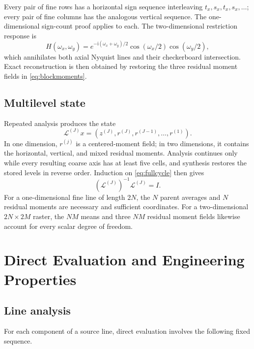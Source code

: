 \documentclass[journal]{IEEEtran}
\begin{document}
Every pair of fine rows has a horizontal sign sequence interleaving
\(t_x,s_x,t_x,s_x,\ldots\); every pair of fine columns has the analogous
vertical sequence. The one-dimensional sign-count proof applies to each.
The two-dimensional restriction response is
\begin{equation}
 H(\omega_x,\omega_y)=e^{-\mathrm i(\omega_x+\omega_y)/2}
 \cos(\omega_x/2)\cos(\omega_y/2),
 \label{eq:nyquist2d}
\end{equation}
which annihilates both axial Nyquist lines and their checkerboard
intersection. Exact reconstruction is then obtained by restoring the three
residual moment fields in \eqref{eq:blockmoments}.

\subsection{Multilevel state}

Repeated analysis produces the state
\begin{equation}
 \mathcal L^{(J)}x=
 \left(z^{(J)},r^{(J)},r^{(J-1)},\ldots,r^{(1)}\right).
 \label{eq:multilevel}
\end{equation}
In one dimension, \(r^{(j)}\) is a centered-moment field; in two dimensions,
it contains the horizontal, vertical, and mixed residual moments. Analysis
continues only while every resulting coarse axis has at least five cells, and
synthesis restores the stored levels in reverse order. Induction on
\eqref{eq:fullcycle} then gives
\begin{equation}
 (\mathcal L^{(J)})^{-1}\mathcal L^{(J)}=I.
 \label{eq:multilevelinverse}
\end{equation}
For a one-dimensional fine line of length \(2N\), the \(N\) parent averages
and \(N\) residual moments are necessary and sufficient coordinates. For a
two-dimensional \(2N\times2M\) raster, the \(NM\) means and three \(NM\)
residual moment fields likewise account for every scalar degree of freedom.

\section{Direct Evaluation and Engineering Properties}

\subsection{Line analysis}

For each component of a source line, direct evaluation involves the following
fixed sequence.
\end{document}
